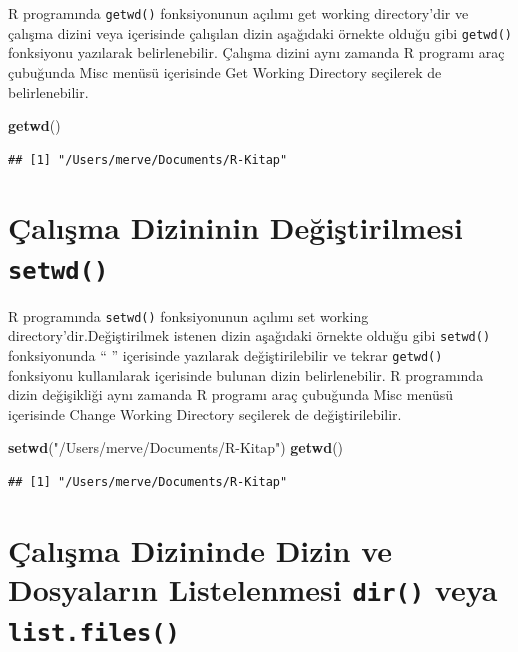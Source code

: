 \documentclass[
]{book}
\newenvironment{Shaded}{\begin{snugshade}}{\end{snugshade}}
\newcommand{\FunctionTok}[1]{\textcolor[rgb]{0.13,0.29,0.53}{\textbf{#1}}}
\newcommand{\NormalTok}[1]{#1}
\newcommand{\StringTok}[1]{\textcolor[rgb]{0.31,0.60,0.02}{#1}}
\begin{document}
R programında \texttt{getwd()} fonksiyonunun açılımı get working directory'dir ve çalışma dizini veya içerisinde çalışılan dizin aşağıdaki örnekte olduğu gibi \texttt{getwd()} fonksiyonu yazılarak belirlenebilir. Çalışma dizini aynı zamanda R programı araç çubuğunda Misc menüsü içerisinde Get Working Directory seçilerek de belirlenebilir.

\begin{Shaded}
\begin{Highlighting}[]
\FunctionTok{getwd}\NormalTok{()}
\end{Highlighting}
\end{Shaded}

\begin{verbatim}
## [1] "/Users/merve/Documents/R-Kitap"
\end{verbatim}

\section{\texorpdfstring{Çalışma Dizininin Değiştirilmesi \texttt{setwd()}}{Çalışma Dizininin Değiştirilmesi setwd()}}\label{uxe7alux131ux15fma-dizininin-deux11fiux15ftirilmesi-setwd}

R programında \texttt{setwd()} fonksiyonunun açılımı set working directory'dir.Değiştirilmek istenen dizin aşağıdaki örnekte olduğu gibi \texttt{setwd()} fonksiyonunda `` '' içerisinde yazılarak değiştirilebilir ve tekrar \texttt{getwd()} fonksiyonu kullanılarak içerisinde bulunan dizin belirlenebilir. R programında dizin değişikliği aynı zamanda R programı araç çubuğunda Misc menüsü içerisinde Change Working Directory seçilerek de değiştirilebilir.

\begin{Shaded}
\begin{Highlighting}[]
\FunctionTok{setwd}\NormalTok{(}\StringTok{"/Users/merve/Documents/R{-}Kitap"}\NormalTok{)}
\FunctionTok{getwd}\NormalTok{()}
\end{Highlighting}
\end{Shaded}

\begin{verbatim}
## [1] "/Users/merve/Documents/R-Kitap"
\end{verbatim}

\section{\texorpdfstring{Çalışma Dizininde Dizin ve Dosyaların Listelenmesi \texttt{dir()} veya \texttt{list.files()}}{Çalışma Dizininde Dizin ve Dosyaların Listelenmesi dir() veya list.files()}}\label{uxe7alux131ux15fma-dizininde-dizin-ve-dosyalarux131n-listelenmesi-dir-veya-list.files}
\end{document}
